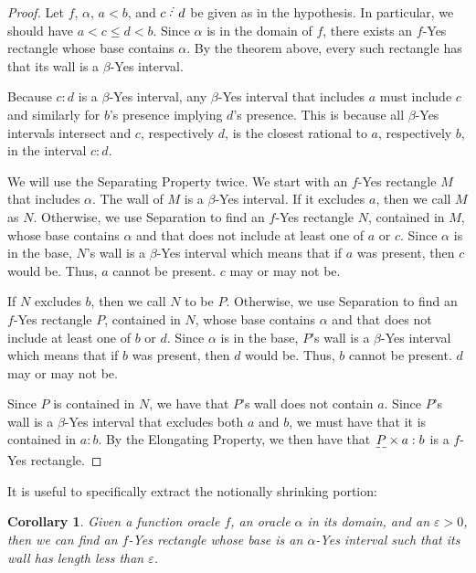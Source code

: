 \documentclass[12pt]{article}
\newtheorem{corollary}{Corollary}[section]
\begin{document}
\begin{proof}
    Let $f$, $\alpha$, $a<b$, and $c\lte d$ be given as in the hypothesis. In particular, we should have $a< c \leq d < b$. Since $\alpha$ is in the domain of $f$, there exists an $f$-Yes rectangle whose base contains $\alpha$. By the theorem above, every such rectangle has that its wall is a $\beta$-Yes interval. 

    Because $c:d$ is a $\beta$-Yes interval, any $\beta$-Yes interval that includes $a$ must include $c$ and similarly for $b$'s presence implying $d$'s presence. This is because all $\beta$-Yes intervals intersect and $c$, respectively $d$, is the closest rational to $a$, respectively $b$, in the interval $c:d$.

    We will use the Separating Property twice. We start with an $f$-Yes rectangle $M$ that includes $\alpha$. The wall of $M$ is a $\beta$-Yes interval. If it excludes $a$, then we call $M$ as $N$. Otherwise, we use Separation to find an $f$-Yes rectangle $N$, contained in $M$, whose base contains $\alpha$ and that does not include at least one of $a$ or $c$. Since $\alpha$ is in the base, $N$'s wall is a $\beta$-Yes interval which means that if $a$ was present, then $c$ would be. Thus, $a$ cannot be present. $c$ may or may not be. 

    If $N$ excludes $b$, then we call $N$ to be $P$. Otherwise, we use Separation to find an $f$-Yes rectangle $P$, contained in $N$, whose base contains $\alpha$ and that does not include at least one of $b$ or $d$. Since $\alpha$ is in the base, $P$'s wall is a $\beta$-Yes interval which means that if $b$ was present, then $d$ would be. Thus, $b$ cannot be present. $d$ may or may not be. 

    Since $P$ is contained in $N$, we have that $P$'s wall does not contain $a$. Since $P$'s wall is a $\beta$-Yes interval that excludes both $a$ and $b$, we must have that it is contained in $a:b$. By the Elongating Property, we then have that $\base{P} \times a:b$ is a $f$-Yes rectangle. 

\end{proof}


It is useful to specifically extract the notionally shrinking portion:

\begin{corollary}
Given a function oracle $f$, an oracle $\alpha$ in its domain, and an $\varepsilon > 0$, then we can find an $f$-Yes rectangle whose base is an $\alpha$-Yes interval such that its wall has length less than $\varepsilon$.
\end{corollary}
\end{document}
